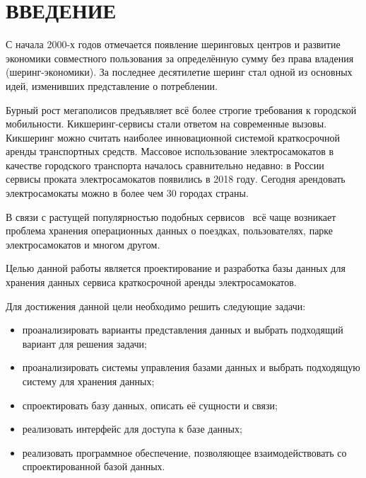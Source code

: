 \chapter*{ВВЕДЕНИЕ}

С начала 2000-х годов отмечается появление шеринговых центров и развитие экономики совместного пользования за определённую сумму без права владения  (шеринг-экономики). За последнее десятилетие шеринг стал одной из основных идей, изменивших представление о потреблении.

Бурный рост мегаполисов предъявляет всё более строгие требования к городской мобильности. Кикшеринг-сервисы стали ответом на современные вызовы. Кикшеринг можно считать наиболее инновационной системой краткосрочной аренды транспортных средств. Массовое использование электросамокатов в качестве городского транспорта началось сравнительно недавно: в России сервисы проката электросамокатов появились в 2018 году. Сегодня арендовать электросамокаты можно в более чем 30 городах страны.

В связи с растущей популярностью подобных сервисов~\cite{popularity} всё чаще возникает проблема хранения операционных данных о поездках, пользователях, парке электросамокатов и многом другом.

Целью данной работы является проектирование и разработка базы данных для хранения данных сервиса краткосрочной аренды электросамокатов.

Для достижения данной цели необходимо решить следующие задачи:

\begin{itemize}
	\item проанализировать варианты представления данных и выбрать подходящий вариант для решения задачи;
	\item проанализировать системы управления базами данных и выбрать подходящую систему для хранения данных;
	\item спроектировать базу данных, описать её сущности и связи;
	\item реализовать интерфейс для доступа к базе данных;
	\item реализовать программное обеспечение, позволяющее взаимодействовать со спроектированной базой данных.
\end{itemize}